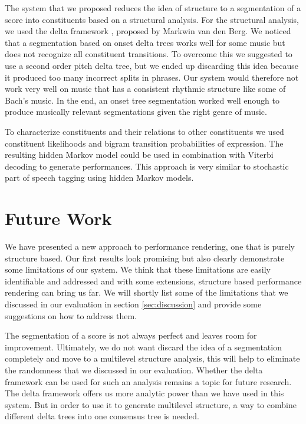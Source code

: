 \documentclass[a4paper,10pt]{article}
\begin{document}
The system that we proposed reduces the idea of structure to a segmentation of a score into constituents based on a structural analysis. For the structural analysis, we used the delta framework \cite{markwin}, proposed by Markwin van den Berg. We noticed that a segmentation based on onset delta trees works well for some music but does not recognize all constituent transitions. To overcome this we suggested to use a second order pitch delta tree, but we ended up discarding this idea because it produced too many incorrect splits in phrases. Our system would therefore not work very well on music that has a consistent rhythmic structure like some of Bach's music. In the end, an onset tree segmentation worked well enough to produce musically relevant segmentations given the right genre of music.

To characterize constituents and their relations to other constituents we used constituent likelihoods and bigram transition probabilities of expression. The resulting hidden Markov model could be used in combination with Viterbi decoding to generate performances. This approach is very similar to stochastic part of speech tagging using hidden Markov models.

\section{Future Work}
\label{sec:futurework}

We have presented a new approach to performance rendering, one that is purely structure based. Our first results look promising but also clearly demonstrate some limitations of our system. We think that these limitations are easily identifiable and addressed and with some extensions, structure based performance rendering can bring us far. We will shortly list some of the limitations that we discussed in our evaluation in section \ref{sec:discussion} and provide some suggestions on how to address them.

The segmentation of a score is not always perfect and leaves room for improvement. Ultimately, we do not want discard the idea of a segmentation completely and move to a multilevel structure analysis, this will help to eliminate the randomness that we discussed in our evaluation. Whether the delta framework can be used for such an analysis remains a topic for future research. The delta framework offers us more analytic power than we have used in this system. But in order to use it to generate multilevel structure, a way to combine different delta trees into one consensus tree is needed.
\end{document}
